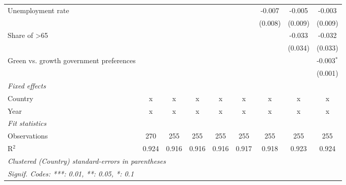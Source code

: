 \begin{table}[htbp]
\begin{tabular}{lcccccccc}
      Unemployment rate                                          &         &         &         &         &         & -0.007  & -0.005  & -0.003\\   
                                                                 &         &         &         &         &         & (0.008) & (0.009) & (0.009)\\   
      Share of >65                                               &         &         &         &         &         &         & -0.033  & -0.032\\   
                                                                 &         &         &         &         &         &         & (0.034) & (0.033)\\   
      Green vs. growth government preferences                    &         &         &         &         &         &         &         & -0.003$^{*}$\\   
                                                                 &         &         &         &         &         &         &         & (0.001)\\   
      \emph{Fixed effects}\\
      Country                                                    & x       & x       & x       & x       & x       & x       & x       & x\\  
      Year                                                       & x       & x       & x       & x       & x       & x       & x       & x\\  
      \midrule \emph{Fit statistics}\\
      Observations                                               & 270     & 255     & 255     & 255     & 255     & 255     & 255     & 255\\  
      R$^2$                                                      & 0.924   & 0.916   & 0.916   & 0.916   & 0.917   & 0.918   & 0.923   & 0.924\\  
      \midrule
      \multicolumn{9}{l}{\emph{Clustered (Country) standard-errors in parentheses}}\\
      \multicolumn{9}{l}{\emph{Signif. Codes: ***: 0.01, **: 0.05, *: 0.1}}\\
   \end{tabular}
\end{table}


